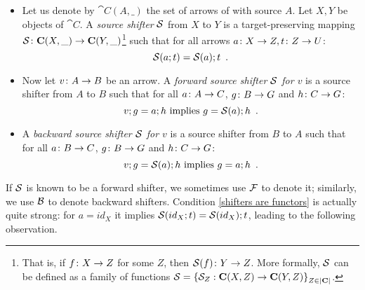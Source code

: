 \begin{definition}
\begin{itemize}[topsep=\smallskipamount]
\item Let us denote by $\cat{C}(A,\_)$ the set of arrows of  with source $A$. Let $X,Y$ be objects of $\cat{C}$. A \emph{source shifter} $\mathcal{S}$ from $X$ to $Y$ is a target-preserving mapping $\mathcal{S} \colon \mathbf{C}(X,\_) \rightarrow \mathbf{C}(Y, \_)$\footnote{That is, if $f\colon X \rightarrow Z$ for some $Z$, then $\mathcal{S}(f)\colon Y \rightarrow Z$. More formally, $\mathcal{S}$  can be defined as a family of functions $\mathcal{S} = \left\{\mathcal{S}_Z : \mathbf{C}(X, Z) \rightarrow \mathbf{C}(Y, Z)\right\}_{Z\in |\mathbf{C}|}$.} such that for all arrows $a\colon X\rightarrow Z, t\colon Z\rightarrow U$:
%
%
\begin{equation}\eqlabel{shifters are functors}
\cS(a;t) = \cS(a);t \enspace.
\end{equation}
%
\item Now let $v\colon A\rightarrow B$ be an arrow. A \emph{forward source shifter $\mathcal{S}$ for $v$} is a source shifter from $A$ to $B$ such that for all $a\colon A\rightarrow C$, $g\colon B\rightarrow G$ and $h\colon C\rightarrow G$:
%
\begin{equation}\eqlabel{forward condition}
v;g = a;h \text{ implies } g = \cS(a);h \enspace.
\end{equation}
%
\item A \emph{backward source shifter $\mathcal{S}$ for $v$} is a source shifter from $B$ to $A$ such that for all $a\colon B\rightarrow C$, $g\colon B\rightarrow G$ and $h\colon C\rightarrow G$:
%
\begin{equation}\eqlabel{backward condition}
v;g = \cS(a);h \text{ implies } g = a;h \enspace.
\end{equation}
\end{itemize}
\end{definition}
%
If $\mathcal{S}$ is known to be a forward shifter, we sometimes use $\mathcal{F}$ to denote it; similarly, we use $\mathcal{B}$ to denote backward shifters. 
Condition \eqref{shifters are functors} is actually quite strong: for $a = id_X$ it implies $\mathcal{S}(id_X;t) = \mathcal{S}(id_X);t$,  leading to the following observation.

